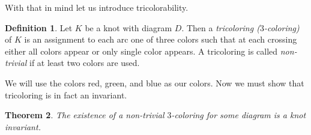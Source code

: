 \documentclass[12pt]{amsart}
\newtheorem{theorem}{Theorem}[section]
\theoremstyle{definition}
\newtheorem{definition}[theorem]{Definition}
\theoremstyle{remark}
\numberwithin{equation}{section}
\begin{document}
With that in mind let us introduce tricolorability.

\begin{definition}
  Let $K$ be a knot with diagram $D$. Then a \textit{tricoloring ($3$-coloring)}
  of $K$ is an assignment to each arc one of three colors
  such that at each crossing either all colors appear or
  only single color appears. A tricoloring is called \textit{non-trivial}
  if at least two colors are used.
\end{definition}

We will use the colors red, green, and blue as our colors.
Now we must show that tricoloring is in fact an invariant.

\begin{theorem}
  The existence of a non-trivial $3$-coloring for some diagram is a
  knot invariant.
\end{theorem}
\end{document}
